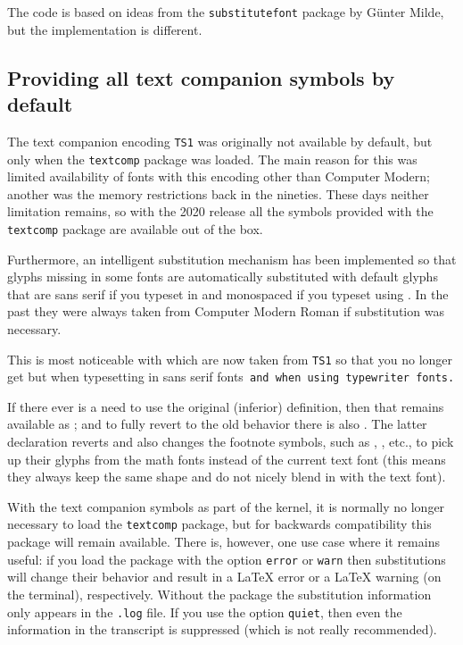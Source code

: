 \documentclass{ltnews}
\providecommand\option[1]{\texttt{#1}}
\providecommand\pkg[1]{\texttt{#1}}
\begin{document}
The code is based on ideas from the \pkg{substitutefont}
package by Günter Milde, but the implementation is different.


\subsection{Providing all text companion symbols by default}

The text companion encoding \texttt{TS1} was originally not available
by default, but only when the \pkg{textcomp} package was loaded. The
main reason for this was limited availability of fonts with this encoding other than
Computer Modern; another was the memory restrictions back in the nineties.
These days neither limitation remains, so with the 2020 release all
the symbols provided with the \pkg{textcomp} package are available out
of the box.

Furthermore, an intelligent substitution mechanism has been
implemented so that glyphs missing in some fonts are automatically
substituted with default glyphs that are sans serif if you typeset in
 and monospaced if you typeset using . In the
past they were always taken from Computer Modern Roman if substitution
was necessary.



\textsf{This is most noticeable with  which are now
  taken from \texttt{TS1} so that you no longer get
  \textrm{} but  when typesetting
  in sans serif fonts}\texttt{ and  when using
  typewriter fonts.}

If there ever is a need to use the original (inferior) definition,
then that remains available as ; and to fully
revert to the old behavior there is also
. The latter declaration reverts 
and also changes the footnote symbols, such as ,
, etc., to pick up their glyphs from the math
fonts instead of the current text font (this means they always keep
the same shape and do not nicely blend in with the text font).

With the text companion symbols as part of the kernel, it is normally
no longer necessary to load the \pkg{textcomp} package, but for
backwards compatibility this package will remain available.  There is,
however, one use case where it remains useful: if you load the package
with the option \option{error} or \option{warn} then substitutions
will change their behavior and result in a \LaTeX{} error or a
\LaTeX{} warning (on the terminal), respectively. Without the package
the substitution information only appears in the \texttt{.log}
file. If you use the option \option{quiet}, then even the information in
the transcript is suppressed (which is not really recommended).
\end{document}
